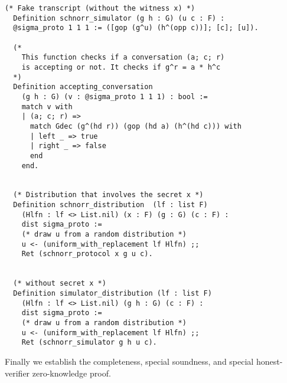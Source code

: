 \documentclass[conference,compsoc]{IEEEtran}
\begin{document}
\begin{lstlisting}[language=Coq]
  (* Fake transcript (without the witness x) *)
  Definition schnorr_simulator (g h : G) (u c : F) : 
  @sigma_proto 1 1 1 := ([gop (g^u) (h^(opp c))]; [c]; [u]).
  
  (* 
    This function checks if a conversation (a; c; r) 
    is accepting or not. It checks if g^r = a * h^c
  *)
  Definition accepting_conversation 
    (g h : G) (v : @sigma_proto 1 1 1) : bool :=
    match v with
    | (a; c; r) =>  
      match Gdec (g^(hd r)) (gop (hd a) (h^(hd c))) with 
      | left _ => true
      | right _ => false 
      end
    end.
  
  
  (* Distribution that involves the secret x *)
  Definition schnorr_distribution  (lf : list F) 
    (Hlfn : lf <> List.nil) (x : F) (g : G) (c : F) : 
    dist sigma_proto :=
    (* draw u from a random distribution *)
    u <- (uniform_with_replacement lf Hlfn) ;;
    Ret (schnorr_protocol x g u c).
  
  
  (* without secret x *)
  Definition simulator_distribution (lf : list F) 
    (Hlfn : lf <> List.nil) (g h : G) (c : F) : 
    dist sigma_proto :=
    (* draw u from a random distribution *)
    u <- (uniform_with_replacement lf Hlfn) ;;
    Ret (schnorr_simulator g h u c).
  \end{lstlisting}
  
  Finally we establish the completeness, special soundness, 
  and special honest-verifier zero-knowledge proof. 
  
\end{document}
